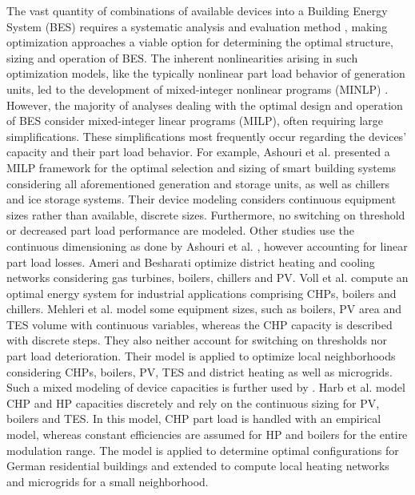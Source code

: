 The vast quantity of combinations of available devices into a Building Energy System (BES) requires a systematic analysis and evaluation method \cite{Yang2015}, making optimization approaches a viable option for determining the optimal structure, sizing and operation of BES.
The inherent nonlinearities arising in such optimization models, like the typically nonlinear part load behavior of generation units, led to the development of mixed-integer nonlinear programs (MINLP) \cite{Pruitt2013,Ren2008}.
However, the majority of analyses dealing with the optimal design and operation of BES consider mixed-integer linear programs (MILP), often requiring large simplifications.
These simplifications most frequently occur regarding the devices' capacity and their part load behavior.
For example, Ashouri et al. \cite{Ashouri2013} presented a MILP framework for the optimal selection and sizing of smart building systems considering all aforementioned generation and storage units, as well as chillers and ice storage systems. 
Their device modeling considers continuous equipment sizes rather than available, discrete sizes.
Furthermore, no switching on threshold or decreased part load performance are modeled.
Other studies \cite{Ameri2016,Voll2013} use the continuous dimensioning as done by Ashouri et al. \cite{Ashouri2013}, however accounting for linear part load losses.
Ameri and Besharati \cite{Ameri2016} optimize district heating and cooling networks considering gas turbines, boilers, chillers and PV.
Voll et al. \cite{Voll2013} compute an optimal energy system for industrial applications comprising CHPs, boilers and chillers.
Mehleri et al. \cite{Mehleri2012,Mehleri2013} model some equipment sizes, such as boilers, PV area and TES volume with continuous variables, whereas the CHP capacity is described with discrete steps.
They also neither account for switching on thresholds nor part load deterioration.
Their model is applied to optimize local neighborhoods considering CHPs, boilers, PV, TES and district heating as well as microgrids.
Such a mixed modeling of device capacities is further used by \cite{Harb2016,Lozano2010}.
Harb et al. \cite{Harb2016} model CHP and HP capacities discretely and rely on the continuous sizing for PV, boilers and TES.
In this model, CHP part load is handled with an empirical model, whereas constant efficiencies are assumed for HP and boilers for the entire modulation range.
The model is applied to determine optimal configurations for German residential buildings and extended to compute local heating networks and microgrids for a small neighborhood.

